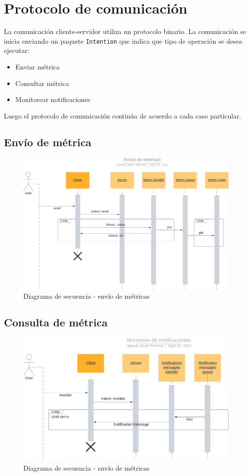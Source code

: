 \documentclass[a4paper,oneside]{article}
\begin{document}
\section{Protocolo de comunicación}
La comunicación cliente-servidor utiliza un protocolo binario. La comunicación se inicia enviando un paquete \texttt{Intention}\cite{IntentionPackage} que indica que tipo de operación se desea ejecutar:
\begin{itemize}
	\item Enviar métrica
	\item Consultar métrica
	\item Monitorear notificaciones
\end{itemize}

Luego el protocolo de comunicación continúa de acuerdo a cada caso particular.

\subsection{Envío de métrica}
\begin{figure}[H]
\centering
\includegraphics[width=\textwidth]{images/envio_metricas.png}
\caption{Diagrama de secuencia - envío de métricas}
\end{figure}

\subsection{Consulta de métrica}
\begin{figure}[H]
\centering
\includegraphics[width=\textwidth]{images/query.png}
\caption{Diagrama de secuencia - envío de métricas}
\end{figure}
\end{document}
